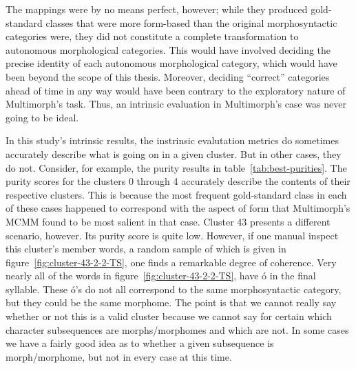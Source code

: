 The mappings were by no means perfect, however; while they produced gold-standard classes that were more
form-based than the original morphosyntactic categories were, they did not constitute a complete transformation
to autonomous morphological categories. This would have involved deciding the precise identity of each autonomous 
morphological category, which would have been beyond the scope of this thesis. Moreover, deciding ``correct'' 
categories ahead of time in any way would have been contrary to the exploratory nature of Multimorph's task. 
Thus, an intrinsic evaluation in Multimorph's case was never going to be ideal.

In this study's intrinsic results, the instrinsic evalutation metrics do sometimes accurately describe what is going on in a given cluster. But in other cases, they do not. Consider, for example, the purity results in table~\ref{tab:best-purities}. The purity scores for the clusters 0 through 4 accurately describe the contents of their respective clusters. This is because the most frequent gold-standard class in each of these cases happened to correspond with the aspect of form that Multimorph's MCMM found to be most salient in that case.
Cluster 43 presents a different scenario, however. Its purity score is quite low. However, if one manual inspect this cluster's member words, a random sample of which is given in figure~\ref{fig:cluster-43-2-2-TS}, one finds a remarkable degree of coherence. Very nearly all of the words in 
figure~\ref{fig:cluster-43-2-2-TS}, have \textsf{\'{o}} in the final syllable. These \textsf{\'{o}}'s do not all correspond to the same morphosyntactic category, but they could be the same morphome. The point is that we cannot really say whether or not this is a valid cluster because we cannot say for certain which character subsequences are morphs/morphomes and which are not. In some cases we have a fairly good idea as to whether a given subsequence is morph/morphome, but not in every case at this time.

